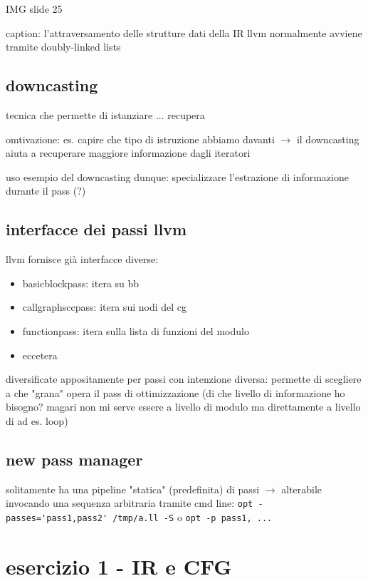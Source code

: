IMG slide 25

caption: l'attraversamento delle strutture dati della IR llvm normalmente avviene tramite doubly-linked lists

\subsection{downcasting}

tecnica che permette di istanziare ... recupera

omtivazione: es. capire che tipo di istruzione abbiamo davanti $\rightarrow$ il downcasting aiuta a recuperare maggiore informazione dagli iteratori

uso esempio del downcasting dunque: specializzare l'estrazione di informazione durante il pass (?)

\subsection{interfacce dei passi llvm}

llvm fornisce gi\`a interfacce diverse:
\begin{itemize}
  \item basicblockpass: itera su bb
  \item callgraphsccpass: itera sui nodi del cg
  \item functionpass: itera sulla lista di funzioni del modulo
  \item eccetera
\end{itemize}

diversificate appositamente per passi con intenzione diversa: permette di scegliere a che "grana" opera il pass di ottimizzazione (di che livello di informazione ho bisogno? magari non mi serve essere a livello di modulo ma direttamente a livello di ad es. loop)


\subsection{new pass manager}

solitamente ha una pipeline "statica" (predefinita) di passi $\rightarrow$ alterabile invocando una sequenza arbitraria tramite cmd line: \lstinline|opt -passes='pass1,pass2' /tmp/a.ll -S| o \lstinline|opt -p pass1, ...|

\section{esercizio 1 - IR e CFG}

